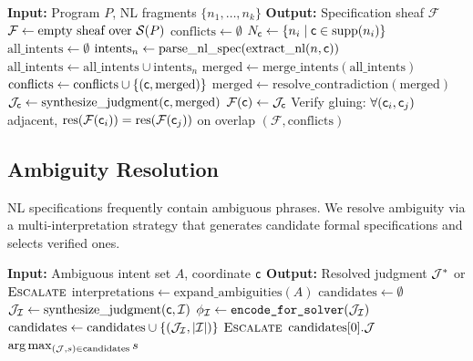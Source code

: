 \documentclass[11pt]{article}
\newcommand{\EncodeForSolver}{\texttt{encode\_for\_solver}}
\begin{document}
\begin{algorithm}[H]
\caption{Multi-Coordinate Specification Synthesis}
\label{alg:spec-synthesis}
\begin{algorithmic}[1]
\STATE \textbf{Input:} Program $P$, NL fragments $\{n_1, \ldots, n_k\}$
\STATE \textbf{Output:} Specification sheaf $\mathcal{F}$
\STATE $\mathcal{F} \gets \text{empty sheaf over } \mathcal{S}(P)$
\STATE $\text{conflicts} \gets \emptyset$
  \STATE $N_{\mathsf{c}} \gets \{n_i \mid \mathsf{c} \in \mathrm{supp}(n_i)\}$
  \STATE $\text{all\_intents} \gets \emptyset$
    \STATE $\text{intents}_n \gets \text{parse\_nl\_spec}
           (\text{extract\_nl}(n, \mathsf{c}))$
    \STATE $\text{all\_intents} \gets \text{all\_intents} \cup
           \text{intents}_n$
  \ENDFOR
  \STATE $\text{merged} \gets \text{merge\_intents}(\text{all\_intents})$
    \STATE $\text{conflicts} \gets \text{conflicts} \cup
           \{(\mathsf{c}, \text{merged})\}$
    \STATE $\text{merged} \gets \text{resolve\_contradiction}
           (\text{merged})$
  \ENDIF
  \STATE $\mathcal{J}_{\mathsf{c}} \gets \text{synthesize\_judgment}
         (\mathsf{c}, \text{merged})$
  \STATE $\mathcal{F}(\mathsf{c}) \gets \mathcal{J}_{\mathsf{c}}$
\ENDFOR
\STATE Verify gluing: $\forall (\mathsf{c}_i, \mathsf{c}_j)$ adjacent,
       $\mathrm{res}(\mathcal{F}(\mathsf{c}_i)) = \mathrm{res}(\mathcal{F}(\mathsf{c}_j))$
       on overlap
\RETURN $(\mathcal{F}, \text{conflicts})$
\end{algorithmic}
\end{algorithm}

\subsection{Ambiguity Resolution}

NL specifications frequently contain ambiguous phrases.  We resolve
ambiguity via a multi-interpretation strategy that generates candidate
formal specifications and selects verified ones.

\begin{algorithm}[H]
\caption{Ambiguity Resolution via Multi-Interpretation Verification}
\label{alg:ambiguity}
\begin{algorithmic}[1]
\STATE \textbf{Input:} Ambiguous intent set $A$, coordinate $\mathsf{c}$
\STATE \textbf{Output:} Resolved judgment $\mathcal{J}^*$ or $\textsc{Escalate}$
\STATE $\text{interpretations} \gets
       \text{expand\_ambiguities}(A)$
\STATE $\text{candidates} \gets \emptyset$
  \STATE $\mathcal{J}_\mathcal{I} \gets
         \text{synthesize\_judgment}(\mathsf{c}, \mathcal{I})$
  \STATE $\phi_\mathcal{I} \gets \EncodeForSolver(\J_\mathcal{I})$
    \STATE $\text{candidates} \gets \text{candidates} \cup
           \{(\mathcal{J}_\mathcal{I}, |\mathcal{I}|)\}$
  \ENDIF
\ENDFOR
{}
  \RETURN $\textsc{Escalate}$
  \RETURN $\text{candidates}[0].\mathcal{J}$
\ELSE
  \RETURN $\arg\max_{(\mathcal{J}, s) \in \text{candidates}} s$
\ENDIF
\end{algorithmic}
\end{algorithm}
\end{document}
